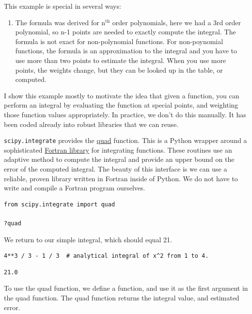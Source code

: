 \documentclass[11pt]{article}
\begin{document}
This example is special in several ways:
\begin{enumerate}
\item The formula was derived for n\(^{\text{th}}\) order polynomials, here we had a 3rd order polynomial, so n-1 points are needed to exactly compute the integral. The formula is not exact for non-polynomial functions.
For non-poynomial functions, the formula is an approximation to the integral and you have to use more than two points to estimate the integral. When you use more points, the weights change, but they can be looked up in the table, or computed.
\end{enumerate}

I show this example mostly to motivate the idea that given a function, you can perform an integral by evaluating the function at special points, and weighting those function values appropriately. In practice, we don't do this manually. It has been coded already into robust libraries that we can reuse.

\texttt{scipy.integrate} provides the \href{https://docs.scipy.org/doc/scipy-0.18.1/reference/generated/scipy.integrate.quad.html\#scipy.integrate.quad}{quad} function. This is a Python wrapper around a sophisticated \href{https://en.wikipedia.org/wiki/QUADPACK}{Fortran library} for integrating functions. These routines use an adaptive method to compute the integral and provide an upper bound on the error of the computed integral. The beauty of this interface is we can use a reliable, proven library written in Fortran inside of Python. We do not have to write and compile a Fortran program ourselves.

\begin{verbatim}
from scipy.integrate import quad

?quad
\end{verbatim}

We return to our simple integral, which should equal 21.

\begin{verbatim}
4**3 / 3 - 1 / 3  # analytical integral of x^2 from 1 to 4.
\end{verbatim}

\begin{verbatim}
21.0
\end{verbatim}

To use the quad function, we define a function, and use it as the first argument in the quad function. The quad function returns the integral value, and estimated error.
\end{document}
